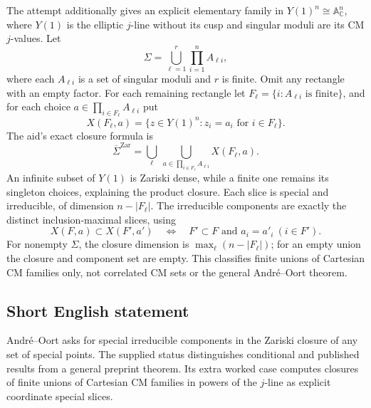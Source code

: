 \documentclass[11pt]{article}
\newcommand{\C}{\mathbb{C}}
\newcommand{\A}{\mathbb{A}}
\begin{document}
The attempt additionally gives an explicit elementary family in $Y(1)^n\cong\A^n_{\C}$, where $Y(1)$ is the elliptic $j$-line without its cusp and singular moduli are its CM $j$-values. Let
\[
 \Sigma=\bigcup_{\ell=1}^{r}\prod_{i=1}^n A_{\ell i},
\]
where each $A_{\ell i}$ is a set of singular moduli and $r$ is finite. Omit any rectangle with an empty factor. For each remaining rectangle let $F_\ell=\{i:A_{\ell i}\text{ is finite}\}$, and for each choice $a\in\prod_{i\in F_\ell}A_{\ell i}$ put
\[
 X(F_\ell,a)=\{z\in Y(1)^n:z_i=a_i\text{ for }i\in F_\ell\}.
\]
The aid's exact closure formula is
\[
 \overline\Sigma^{\mathrm{Zar}}=
       \bigcup_{\ell}\ \bigcup_{a\in\prod_{i\in F_\ell}A_{\ell i}}
                 X(F_\ell,a).
\]
An infinite subset of $Y(1)$ is Zariski dense, while a finite one remains its singleton choices, explaining the product closure. Each slice is special and irreducible, of dimension $n-|F_\ell|$. The irreducible components are exactly the distinct inclusion-maximal slices, using
\[
 X(F,a)\subset X(F',a')
 \quad\Longleftrightarrow\quad F'\subset F\text{ and }a_i=a'_i\ (i\in F').
\]
For nonempty $\Sigma$, the closure dimension is $\max_\ell(n-|F_\ell|)$; for an empty union the closure and component set are empty. This classifies finite unions of Cartesian CM families only, not correlated CM sets or the general Andr\'e--Oort theorem.
\subsection{Short English statement}
Andr\'e--Oort asks for special irreducible components in the Zariski closure of any set of special points. The supplied status distinguishes conditional and published results from a general preprint theorem. Its extra worked case computes closures of finite unions of Cartesian CM families in powers of the $j$-line as explicit coordinate special slices.
\end{document}

